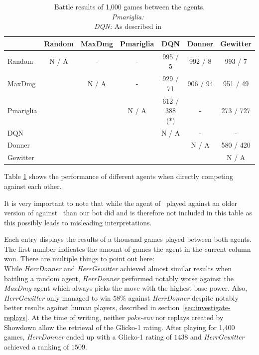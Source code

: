 \begin{table}[h]
  \centering
  \caption{Battle results of 1,000 games between the agents. \\
  \emph{Pmariglia:}~\autocite{Github:pmariglia-showdown} \\
  \emph{DQN:} As described  in~\autocite{Huang_Lee_2019}}
  \begin{tabular}{|l|c|c|c|c|c|c|}
    \hline
     & Random & MaxDmg & Pmariglia & DQN & Donner   & Gewitter  \\
    \hline
    Random                                         & N / A  & -      & -         & 995 / 5   & 992 / 8  & 993 / 7   \\
    \hline
    MaxDmg                                         &        & N / A  & -         & 929 / 71  & 906 / 94 & 951 / 49  \\
    \hline
    Pmariglia                                      &        &        & N / A     & 612 / 388 (*)  & -   & 273 / 727 \\
    \hline
    DQN                                            &        &        &           & N / A     & -        & -         \\
    \hline
    Donner                                         &        &        &           &           & N / A    & 580 / 420 \\
    \hline
    Gewitter                                       &        &        &           &           &          & N / A     \\                            
    \hline
    \end{tabular}
    \label{tab:agent-performance}
  \end{table}
Table \ref{tab:agent-performance} shows the performance of different agents when directly competing against each other.

It is very important to note that while the agent of~\autocite{Huang_Lee_2019} played against an older version of
against~\autocite*{Github:pmariglia-showdown} than our bot did and is therefore not included in this table as 
this possibly leads to misleading interpretations. 


Each entry displays the results of a thousand games played between both agents. The first number indicates the amount
of games the agent in the current column won. There are multiple things to point out here: \\
While \textit{HerrDonner} and \textit{HerrGewitter} achieved almost similar results when battling a random agent, 
\textit{HerrDonner} performed notably worse against the \textit{MaxDmg} agent which always picks the move with the
highest base power. Also, \textit{HerrGewitter} only managed to win $58\%$ against \textit{HerrDonner} despite notably
better results against human players, described in section~\ref{sec:investigate-replays}. At the time of writing,
neither \textit{poke-env} nor replays created by Showdown allow the retrieval of the Glicko-1 rating. After playing
for 1,400 games, \textit{HerrDonner} ended up with a Glicko-1 rating of $1438$ and \textit{HerrGewitter} achieved
a ranking of $1509$.


